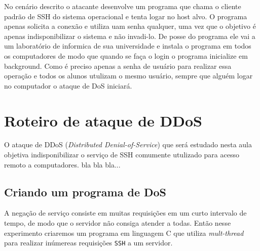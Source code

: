\documentclass[12pt]{abnt}
\begin{document}
No cenário descrito o atacante desenvolve um programa que chama o cliente padrão de SSH do sistema operacional e tenta logar no host alvo. O programa
apenas solicita a conexão e utiliza uam senha qualquer, uma vez que o objetivo é apenas indisponibilizar o sistema e não invadi-lo.
De posse do programa ele vai a um laboratório de informica de sua universidade e instala o programa em todos os computadores de modo que
quando se faça o login o programa inicialize em background. Como é preciso apenas a senha de usuário para realizar essa operação e todos
os alunos utulizam o mesmo usuário, sempre que alguém logar no computador o ataque de DoS iniciará.

\chapter{Roteiro de ataque de DDoS}

O ataque de DDoS (\textit{Distributed Denial-of-Service}) que será estudado nesta aula objetiva indisponibilizar o serviço de SSH comumente
utulizado para acesso remoto a computadores. bla bla bla...

\section{Criando um programa de DoS}
\label{programa}

A negação de serviço consiste em muitas requisições em um curto intervalo de tempo, de modo que o servidor não consiga atender a todas. Então nesse
experimento criaremos um programa em linguagem C que utiliza \textit{mult-thread} para realizar inúmereas requisições \texttt{SSH} a um servidor.
\end{document}
